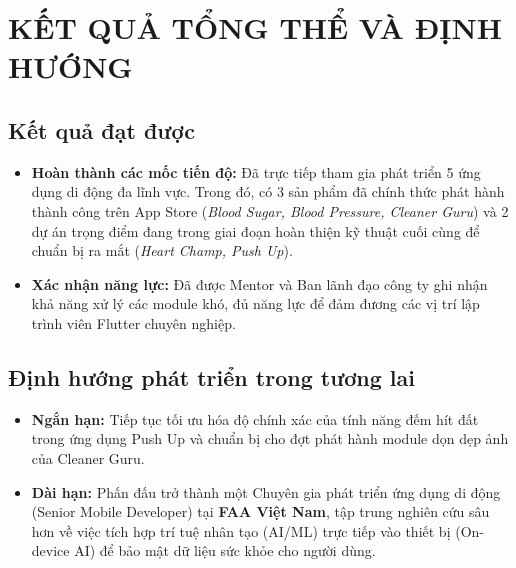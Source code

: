 \documentclass[12pt, a4paper]{article}
\begin{document}
\section{KẾT QUẢ TỔNG THỂ VÀ ĐỊNH HƯỚNG}

\subsection{Kết quả đạt được}
\begin{itemize}
    \item \textbf{Hoàn thành các mốc tiến độ:} Đã trực tiếp tham gia phát triển 5 ứng dụng di động đa lĩnh vực. Trong đó, có 3 sản phẩm đã chính thức phát hành thành công trên App Store (\textit{Blood Sugar, Blood Pressure, Cleaner Guru}) và 2 dự án trọng điểm đang trong giai đoạn hoàn thiện kỹ thuật cuối cùng để chuẩn bị ra mắt (\textit{Heart Champ, Push Up}).
    \item \textbf{Xác nhận năng lực:} Đã được Mentor và Ban lãnh đạo công ty ghi nhận khả năng xử lý các module khó, đủ năng lực để đảm đương các vị trí lập trình viên Flutter chuyên nghiệp.
\end{itemize}

\subsection{Định hướng phát triển trong tương lai}
\begin{itemize}
    \item \textbf{Ngắn hạn:} Tiếp tục tối ưu hóa độ chính xác của tính năng đếm hít đất trong ứng dụng Push Up và chuẩn bị cho đợt phát hành module dọn dẹp ảnh của Cleaner Guru.
    \item \textbf{Dài hạn:} Phấn đấu trở thành một Chuyên gia phát triển ứng dụng di động (Senior Mobile Developer) tại \textbf{FAA Việt Nam}, tập trung nghiên cứu sâu hơn về việc tích hợp trí tuệ nhân tạo (AI/ML) trực tiếp vào thiết bị (On-device AI) để bảo mật dữ liệu sức khỏe cho người dùng.
\end{itemize}
\end{document}
